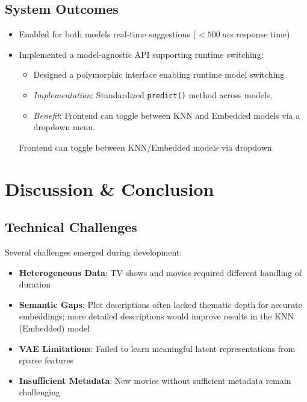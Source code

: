 \documentclass{article}
\begin{document}
\subsection*{System Outcomes}
\begin{itemize}
    \item Enabled for both models real-time suggestions ($<500 \ ms$ response time)

    \item Implemented a model-agnostic API supporting runtime switching:
    \begin{itemize}
        \item Designed a polymorphic interface enabling runtime model switching
        \item \textit{Implementation}: Standardized \texttt{predict()} method across models.
        \item \textit{Benefit}: Frontend can toggle between KNN and Embedded models via a dropdown menu.
    \end{itemize}Frontend can toggle between KNN/Embedded models via dropdown
\end{itemize}


    

  


\section*{Discussion \& Conclusion}

\subsection*{Technical Challenges}
Several challenges emerged during development:
\begin{itemize}
    \item \textbf{Heterogeneous Data}: TV shows and movies required different handling of duration
    \item \textbf{Semantic Gaps}: Plot descriptions often lacked thematic depth for accurate embeddings; more detailed descriptions would improve results in the KNN (Embedded) model
    \item \textbf{VAE Limitations}: Failed to learn meaningful latent representations from sparse features
    \item \textbf{Insufficient Metadata}: New movies without sufficient metadata remain challenging
\end{itemize}
\end{document}
